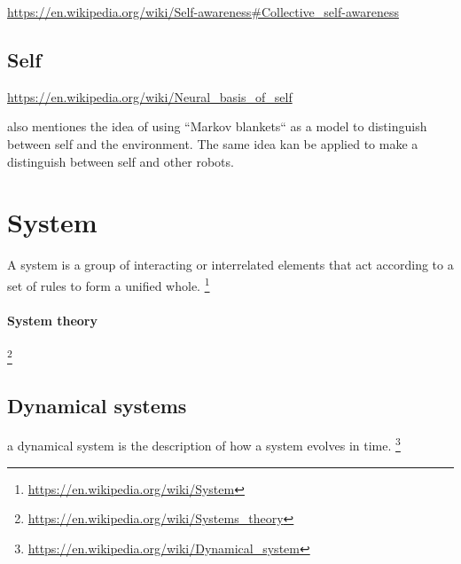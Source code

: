 \documentclass{book}
\providecommand{\seeherefooter}[1]{\footnote{\url{#1}}}
\begin{document}

\url{https://en.wikipedia.org/wiki/Self-awareness\#Collective_self-awareness}

\section{Self}


\url{https://en.wikipedia.org/wiki/Neural_basis_of_self}
    
    also \cite{friston-2013-life-as-we-know-it} mentiones the idea of using ``Markov blankets`` as a model to distinguish between self and the environment. The same idea kan be applied to make a distinguish between self and other robots.

\chapter{System}


A system is a group of interacting or interrelated elements that act according to a set of rules to form a unified whole. \seeherefooter{https://en.wikipedia.org/wiki/System}
    \subsubsection{System theory}
    \seeherefooter{https://en.wikipedia.org/wiki/Systems_theory}
    

\section{Dynamical systems}


a dynamical system is the description of how a system evolves in time.
    \seeherefooter{https://en.wikipedia.org/wiki/Dynamical_system}
    


    
\end{document}
